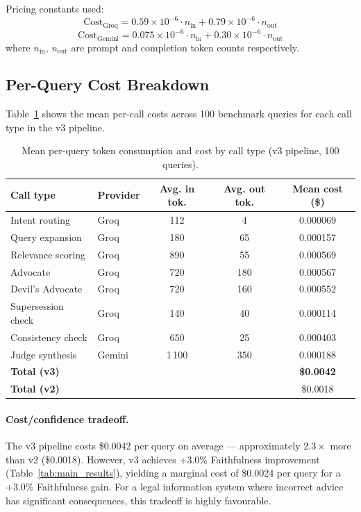 \documentclass[12pt,a4paper]{article}
\begin{document}
Pricing constants used:
\begin{equation}
\text{Cost}_{\text{Groq}} = 0.59 \times 10^{-6} \cdot n_\text{in} + 0.79 \times 10^{-6} \cdot n_\text{out}
\end{equation}
\begin{equation}
\text{Cost}_{\text{Gemini}} = 0.075 \times 10^{-6} \cdot n_\text{in} + 0.30 \times 10^{-6} \cdot n_\text{out}
\end{equation}
where $n_\text{in}$, $n_\text{out}$ are prompt and completion token counts respectively.

\subsection{Per-Query Cost Breakdown}

Table~\ref{tab:cost_breakdown} shows the mean per-call costs across 100 benchmark
queries for each call type in the v3 pipeline.

\begin{table}[H]
\centering
\caption{Mean per-query token consumption and cost by call type (v3 pipeline, 100 queries).}
\label{tab:cost_breakdown}
\begin{tabular}{llccc}
\toprule
\textbf{Call type} & \textbf{Provider} & \textbf{Avg. in tok.} & \textbf{Avg. out tok.} & \textbf{Mean cost (\$)} \\
\midrule
Intent routing        & Groq   & 112 & 4    & 0.000069 \\
Query expansion       & Groq   & 180 & 65   & 0.000157 \\
Relevance scoring     & Groq   & 890 & 55   & 0.000569 \\
Advocate              & Groq   & 720 & 180  & 0.000567 \\
Devil's Advocate      & Groq   & 720 & 160  & 0.000552 \\
Supersession check    & Groq   & 140 & 40   & 0.000114 \\
Consistency check     & Groq   & 650 & 25   & 0.000403 \\
Judge synthesis       & Gemini & 1\,100 & 350 & 0.000188 \\
\midrule
\textbf{Total (v3)}  &        &     &      & \textbf{\$0.0042} \\
\textbf{Total (v2)}  &        &     &      & \$0.0018 \\
\bottomrule
\end{tabular}
\end{table}

\paragraph{Cost/confidence tradeoff.} The v3 pipeline costs \$0.0042 per query
on average — approximately $2.3\times$ more than v2 (\$0.0018). However, v3
achieves +3.0\% Faithfulness improvement (Table~\ref{tab:main_results}),
yielding a marginal cost of \$0.0024 per query for a +3.0\% Faithfulness gain.
For a legal information system where incorrect advice has significant consequences,
this tradeoff is highly favourable.
\end{document}
